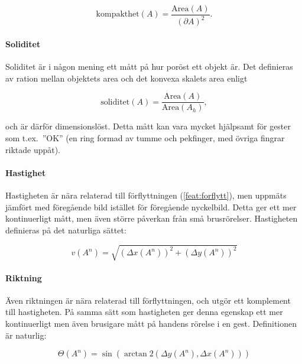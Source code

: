\documentclass[../rapport_MVEX01-11-05]{subfiles}
\begin{document}
\begin{equation*}
  \textrm{kompakthet}(A) = \frac{\textrm{Area}(A)}{\left(\partial
  A\right)^2}.
\end{equation*}

\paragraph{Soliditet}
\label{feat:soliditet}

Soliditet är i någon mening ett mått på hur poröst ett objekt är. Det
definieras av ration mellan objektets area och det konvexa skalets
area enligt

\begin{equation*}
  \textrm{soliditet}(A) = \frac{\textrm{Area}(A)}{\textrm{Area}(A_h)},
\end{equation*}

och är därför dimensionslöst. Detta mått kan vara mycket hjälpsamt för
gester som t.ex.~''OK'' (en ring formad av tumme och pekfinger, med
övriga fingrar riktade uppåt).


\paragraph{Hastighet}
\label{feat:hastighet}

Hastigheten är nära relaterad till förflyttningen
(\ref{feat:forflytt}), men uppmäts jämfört med föregående bild
istället för föregående nyckelbild. Detta ger ett mer kontinuerligt
mått, men även större påverkan från små brusrörelser. Hastigheten
definieras på det naturliga sättet:

\begin{equation*}
  v(A^n) = \sqrt{\left(\Delta x(A^n) \right)^2
               + \left(\Delta y(A^n) \right)^2}
\end{equation*}

\paragraph{Riktning}
\label{feat:riktning}

Även riktningen är nära relaterad till förflyttningen, och utgör ett
komplement till hastigheten. På samma sätt som hastigheten ger denna
egenskap ett mer kontinuerligt men även brusigare mått på handens
rörelse i en gest. Definitionen är naturlig:

\begin{equation*}
  \Theta(A^n) = \sin\left(\arctan\!2\left(
  \Delta y(A^n), \Delta x(A^n)\right)\right)
\end{equation*}
\end{document}
